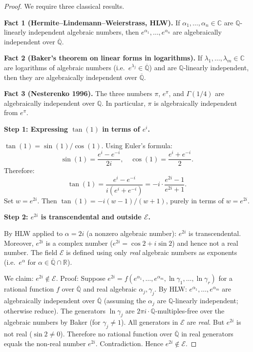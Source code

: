 \documentclass[11pt]{article}
\begin{document}
\begin{proof}
We require three classical results.

\medskip
\noindent\textbf{Fact 1 (Hermite--Lindemann--Weierstrass, HLW).}
If $\alpha_1,\ldots,\alpha_n \in \mathbb{C}$ are $\mathbb{Q}$-linearly independent algebraic numbers,
then $e^{\alpha_1},\ldots,e^{\alpha_n}$ are algebraically independent over $\overline{\mathbb{Q}}$.

\medskip
\noindent\textbf{Fact 2 (Baker's theorem on linear forms in logarithms).}
If $\lambda_1,\ldots,\lambda_m \in \mathbb{C}$ are logarithms of algebraic numbers
(i.e.\ $e^{\lambda_j} \in \overline{\mathbb{Q}}$) and are $\mathbb{Q}$-linearly independent,
then they are algebraically independent over $\overline{\mathbb{Q}}$.

\medskip
\noindent\textbf{Fact 3 (Nesterenko 1996).}
The three numbers $\pi$, $e^\pi$, and $\Gamma(1/4)$ are algebraically independent over $\mathbb{Q}$.
In particular, $\pi$ is algebraically independent from $e^\pi$.

\medskip
\noindent\textbf{Step 1: Expressing $\tan(1)$ in terms of $e^i$.}

$\tan(1) = \sin(1)/\cos(1)$. Using Euler's formula:
\[
  \sin(1) = \frac{e^i - e^{-i}}{2i}, \quad \cos(1) = \frac{e^i + e^{-i}}{2}.
\]
Therefore:
\[
  \tan(1) = \frac{e^i - e^{-i}}{i(e^i + e^{-i})} = -i \cdot \frac{e^{2i}-1}{e^{2i}+1}.
\]
Set $w = e^{2i}$. Then $\tan(1) = -i(w-1)/(w+1)$, purely in terms of $w = e^{2i}$.

\medskip
\noindent\textbf{Step 2: $e^{2i}$ is transcendental and outside $\mathcal{E}$.}

By HLW applied to $\alpha = 2i$ (a nonzero algebraic number): $e^{2i}$ is transcendental.
Moreover, $e^{2i}$ is a complex number ($e^{2i} = \cos 2 + i \sin 2$) and hence
not a real number. The field $\mathcal{E}$ is defined using only \emph{real}
algebraic numbers as exponents (i.e.\ $e^\alpha$ for $\alpha \in \overline{\mathbb{Q}} \cap \mathbb{R}$).

We claim: $e^{2i} \notin \mathcal{E}$.
Proof: Suppose $e^{2i} = f(e^{\alpha_1},\ldots,e^{\alpha_m}, \ln\gamma_1,\ldots,\ln\gamma_r)$
for a rational function $f$ over $\overline{\mathbb{Q}}$ and real algebraic $\alpha_j, \gamma_j$.
By HLW: $e^{\alpha_1},\ldots,e^{\alpha_m}$ are algebraically independent over $\overline{\mathbb{Q}}$
(assuming the $\alpha_j$ are $\mathbb{Q}$-linearly independent; otherwise reduce).
The generators $\ln\gamma_j$ are $2\pi i \cdot \mathbb{Q}$-multiples-free over the algebraic
numbers by Baker (for $\gamma_j \neq 1$). All generators in $\mathcal{E}$ are \emph{real}.
But $e^{2i}$ is not real ($\sin 2 \neq 0$). Therefore no rational function over $\overline{\mathbb{Q}}$
in real generators equals the non-real number $e^{2i}$. Contradiction.
Hence $e^{2i} \notin \mathcal{E}$.


\end{proof}
\end{document}
